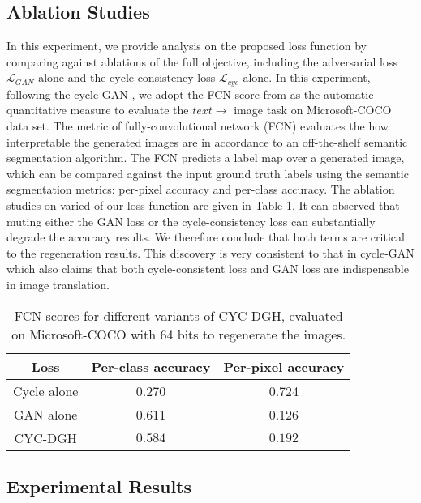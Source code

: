 \documentclass[10pt,journal,twocolumn]{IEEEtran}
\begin{document}
\subsection{Ablation Studies}

In this experiment, we provide analysis on the proposed loss function by comparing against ablations of the full objective, including the adversarial loss $\mathcal{L}_{GAN}$ alone and the cycle consistency loss $\mathcal{L}_{cyc}$ alone. In this experiment, following the cycle-GAN \cite{CycleGAN}, we adopt the FCN-score from \cite{Pix2Pix} as the automatic quantitative measure to evaluate the $text\rightarrow$ image task on Microsoft-COCO data set. The metric of fully-convolutional network (FCN) \cite{Fully-CNN} evaluates the how interpretable the generated images are in accordance to an off-the-shelf semantic segmentation algorithm. The FCN predicts a label map over a generated image, which can be compared against the input ground truth labels using the semantic segmentation metrics: per-pixel accuracy and per-class accuracy. The ablation studies on varied of our loss function are given in Table \ref{tab:FCN-score}. It can observed that muting either the GAN loss or the cycle-consistency loss can substantially degrade the accuracy results. We therefore conclude that both terms are critical to the regeneration results. This discovery is very consistent to that in cycle-GAN \cite{CycleGAN} which also claims that both cycle-consistent loss and GAN loss are indispensable in image translation.


\begin{table}[t]
  \centering
  \begin{tabular}{ |c|c|c|}
  \hline
  Loss & Per-class accuracy & Per-pixel accuracy \\
  \hline
  Cycle alone & 0.270 & 0.724  \\
  GAN alone & 0.611 & 0.126 \\
  CYC-DGH & \color{blue}$\mathbf{0.584}$ & \color{blue}$\mathbf{0.192}$ \\
  \hline
\end{tabular}
  \caption{FCN-scores for different variants of CYC-DGH, evaluated on Microsoft-COCO with 64 bits to regenerate the images.}\label{tab:FCN-score}
\end{table}


\subsection{Experimental Results}
\end{document}
